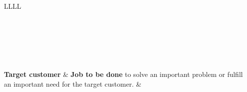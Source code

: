\begin{longtable}{L{\column}L{\column}L{\column}L{\column}}
	
	\caption[Business Model Conceptualization]{Business Model Conceptualization adapted from \citet[p. 54]{Johnson2008}}
	\label{bm:concept}\\
	
	\toprule
	\endfirsthead
	\toprule
	\\ 
	\midrule
	\endhead
	\\
	\bottomrule
	\endfoot
	\bottomrule
	\endlastfoot
	
	\\ \midrule
	
	\textbf{\small Target customer} &
	\small \textbf{Job to be done} to solve an important problem or fulfill an important need for the target customer. &
	 \\ \midrule


\end{longtable}
